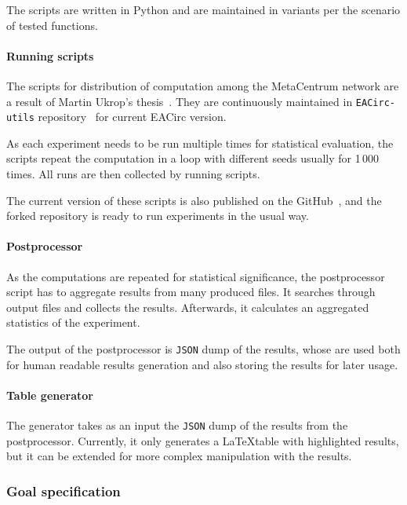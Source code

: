 \documentclass[
  print, %
  Table,   %
  nolof,     %
  nolot,     %
  11pt, %
  oneside  %
]{fithesis3}
\begin{document}
The scripts are written in Python and are maintained in variants per the scenario of tested functions.

\paragraph{Running scripts}

The scripts for distribution of computation among the MetaCentrum network are a result of Martin Ukrop's thesis~\cite{ukropMgrThesis}. They are continuously maintained in \texttt{EACirc-utils} repository~\cite{eaUtils} for current EACirc version.

As each experiment needs to be run multiple times for statistical evaluation, the scripts repeat the computation in a loop with different seeds usually for 1\,000 times. All runs are then collected by running scripts.

The current version of these scripts is also published on the GitHub~\cite{eaUtils}, and the forked repository is ready to run experiments in the usual way.

\paragraph{Postprocessor}

As the computations are repeated for statistical significance, the postprocessor script has to aggregate results from many produced files. It searches through output files and collects the results. Afterwards, it calculates an aggregated statistics of the experiment.

The output of the postprocessor is \texttt{JSON} dump of the results, whose are used both for human readable results generation and also storing the results for later usage.

\paragraph{Table generator}

The generator takes as an input the \texttt{JSON} dump of the results from the postprocessor. Currently, it only generates a \LaTeX table with highlighted results, but it can be extended for more complex manipulation with the results.

\subsubsection{Goal specification}
\label{subsubsec:method-spec-ss-goal}
\end{document}
